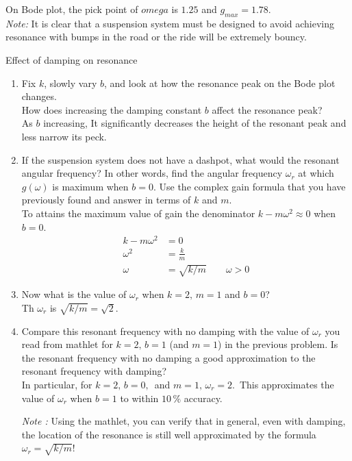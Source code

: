 On Bode plot, the pick point of $omega$ is $1.25$ and $g_ {max} = 1.78$. \\
\emph{Note:} It is clear that a suspension system must be designed to avoid
achieving resonance with bumps in the road or the ride will be extremely bouncy.

\begin{problem}
  Effect of damping on resonance
\end{problem}
\begin{enumerate}
\item Fix $k$, slowly vary $b$, and look at how the resonance peak on the Bode plot changes.\\
  How does increasing the damping constant $b$ affect the resonance peak?\\

  As $b$ increasing, It significantly decreases the height of the resonant peak and less narrow its
  peck. 

\item If the suspension system does not have a dashpot,
  what would the resonant angular frequency?
  In other words, find the angular frequency $\omega_ r$ at which $g(\omega)$ is maximum when $b=0$.
  Use the complex gain formula that you have previously found and answer in terms of $k$ and $m$.\\

  To attains the maximum value of gain the denominator $k - m \omega^2 \approx 0$  when $b = 0$.
  \begin{align*}
    k - m \omega ^2 &= 0 \\
    \omega ^2 &= \frac{k}{m} \\
    \omega &= \sqrt{k / m} \qquad \omega > 0
  \end{align*}

\item Now what is the value of $\omega _r$ when $k=2,\, m=1$ and $b=0$? \\

  Th $\omega _r$ is $ \sqrt{k / m} = \sqrt{2}$.

\item Compare this resonant frequency with no damping with the value of
  $\omega _r$ you read from mathlet for $k=2,\, b=1$ (and $m=1$) in the previous problem.
  Is the resonant frequency with no damping a good approximation to the resonant frequency with damping?\\

  In particular, for $k=2,\, b=0, \,$ and $m=1,\, \omega_ r=2.\,$
  This approximates the value of $\omega_r$ when $b=1$ to within $10\, \%$ accuracy.

  \emph{Note :} Using the mathlet, you can verify that in general,
  even with damping, the location of the resonance is still well approximated
  by the formula  $\omega _r = \sqrt{k/m}$!  
\end{enumerate}

